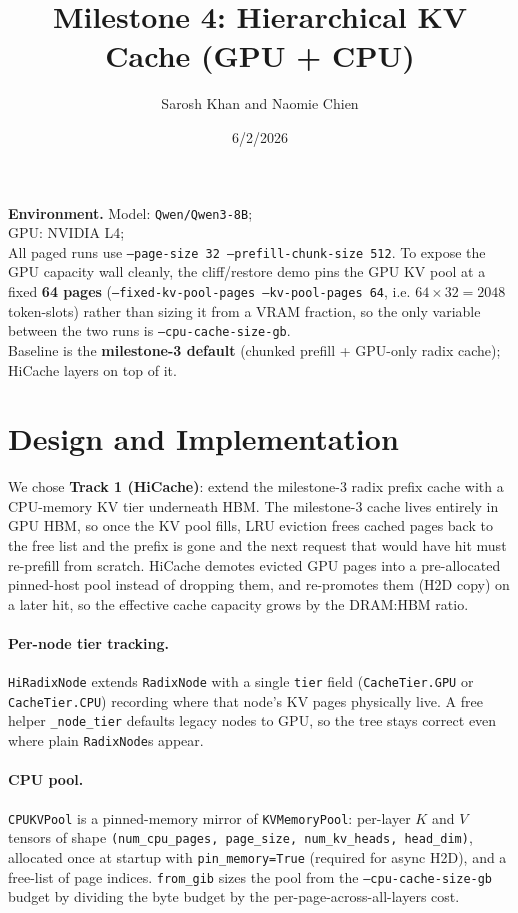 \documentclass[11pt]{article}
\title{Milestone 4: Hierarchical KV Cache (GPU + CPU)}
\author{Sarosh Khan and Naomie Chien}
\date{6/2/2026}
\begin{document}
\maketitle

\noindent\textbf{Environment.}
Model: \texttt{Qwen/Qwen3-8B};\\
GPU: NVIDIA L4;\\
All paged runs use \texttt{--page-size 32 --prefill-chunk-size 512}. To expose the GPU capacity wall cleanly, the cliff/restore demo pins the GPU KV pool at a fixed \textbf{64 pages} (\texttt{--fixed-kv-pool-pages --kv-pool-pages 64}, i.e. $64\times32=2048$ token-slots) rather than sizing it from a VRAM fraction, so the only variable between the two runs is \texttt{--cpu-cache-size-gb}.\\
Baseline is the \textbf{milestone-3 default} (chunked prefill + GPU-only radix cache); HiCache layers on top of it.

\section{Design and Implementation}

We chose \textbf{Track 1 (HiCache)}: extend the milestone-3 radix prefix cache with a CPU-memory KV tier underneath HBM. The milestone-3 cache lives entirely in GPU HBM, so once the KV pool fills, LRU eviction frees cached pages back to the free list and the prefix is gone and the next request that would have hit must re-prefill from scratch. HiCache demotes evicted GPU pages into a pre-allocated pinned-host pool instead of dropping them, and re-promotes them (H2D copy) on a later hit, so the effective cache capacity grows by the DRAM:HBM ratio.

\paragraph{Per-node tier tracking.}
\texttt{HiRadixNode} extends \texttt{RadixNode} with a single \texttt{tier} field (\texttt{CacheTier.GPU} or \texttt{CacheTier.CPU}) recording where that node's KV pages physically live. A free helper \texttt{\_node\_tier} defaults legacy nodes to GPU, so the tree stays correct even where plain \texttt{RadixNode}s appear.

\paragraph{CPU pool.}
\texttt{CPUKVPool} is a pinned-memory mirror of \texttt{KVMemoryPool}: per-layer $K$ and $V$ tensors of shape \texttt{(num\_cpu\_pages, page\_size, num\_kv\_heads, head\_dim)}, allocated once at startup with \texttt{pin\_memory=True} (required for async H2D), and a free-list of page indices. \texttt{from\_gib} sizes the pool from the \texttt{--cpu-cache-size-gb} budget by dividing the byte budget by the per-page-across-all-layers cost.
\end{document}
